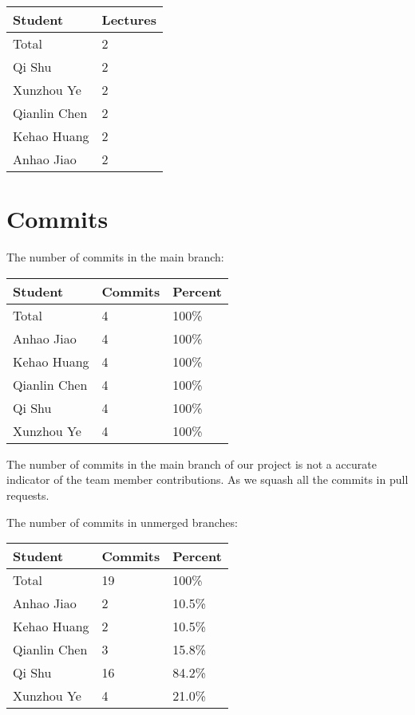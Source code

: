 \documentclass{article}
\begin{document}
\begin{table}[H]
  \centering
  \begin{tabular}{ll}
    \toprule
    \textbf{Student}   & \textbf{Lectures} \\
    \midrule
    Total        & 2           \\
    Qi Shu       & 2           \\
    Xunzhou Ye   & 2           \\
    Qianlin Chen & 2           \\
    Kehao Huang  & 2           \\
    Anhao Jiao   & 2           \\
    \bottomrule
  \end{tabular}
\end{table}


\section{Commits}

The number of commits in the main branch:
\begin{table}[H]
  \centering
  \begin{tabular}{lll}
    \toprule
    \textbf{Student}   & \textbf{Commits} & \textbf{Percent} \\
    \midrule
    Total        & 4          & 100\%      \\
    Anhao Jiao   & 4          & 100\%      \\
    Kehao Huang  & 4          & 100\%      \\
    Qianlin Chen & 4          & 100\%      \\
    Qi Shu       & 4          & 100\%      \\
    Xunzhou Ye   & 4          & 100\%      \\
    \bottomrule
  \end{tabular}
\end{table}

The number of commits in the main branch of our project is not a accurate
indicator of the team member contributions. As we squash all the commits in pull
requests.

The number of commits in unmerged branches:
\begin{table}[H]
  \centering
  \begin{tabular}{lll}
    \toprule
    \textbf{Student}   & \textbf{Commits} & \textbf{Percent} \\
    \midrule
    Total        & 19         & 100\%      \\
    Anhao Jiao   & 2          & 10.5\%     \\
    Kehao Huang  & 2          & 10.5\%     \\
    Qianlin Chen & 3          & 15.8\%     \\
    Qi Shu       & 16         & 84.2\%     \\
    Xunzhou Ye   & 4          & 21.0\%     \\
    \bottomrule
  \end{tabular}
\end{table}
\end{document}
